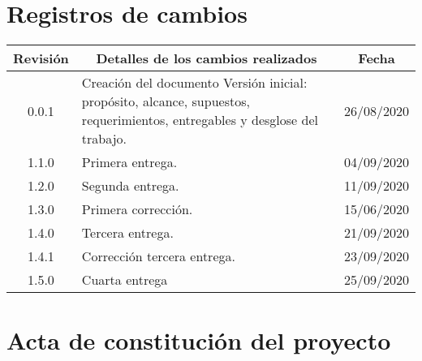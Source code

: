 \documentclass[11pt]{proyecto}
\begin{document}
\maketitle
\thispagestyle{empty}
\pagebreak


\thispagestyle{empty}
{\setlength{\parskip}{0pt}
\tableofcontents{}
}
\pagebreak


\section{Registros de cambios}
\label{sec:registro}


\begin{table}[ht]
\label{tab:registro}
\centering
\begin{tabularx}{\linewidth}{@{}|c|X|c|@{}}
\hline
\rowcolor[HTML]{C0C0C0} 
Revisión & \multicolumn{1}{c|}{\cellcolor[HTML]{C0C0C0}Detalles de los cambios realizados} & Fecha      \\ \hline
0.0.1 & Creación del documento \newline Versión inicial: propósito, alcance, supuestos, requerimientos, entregables y desglose del trabajo.
                                     & 26/08/2020\\ \hline
1.1.0 & Primera entrega.             & 04/09/2020\\ \hline
1.2.0 & Segunda entrega.             & 11/09/2020\\ \hline
1.3.0 & Primera corrección.          & 15/06/2020\\ \hline
1.4.0 & Tercera entrega.             & 21/09/2020\\ \hline
1.4.1 & Corrección tercera entrega.  & 23/09/2020\\ \hline
1.5.0 & Cuarta entrega               & 25/09/2020\\ \hline
\end{tabularx}
\end{table}

\pagebreak



\section{Acta de constitución del proyecto}
\label{sec:acta}
\end{document}
